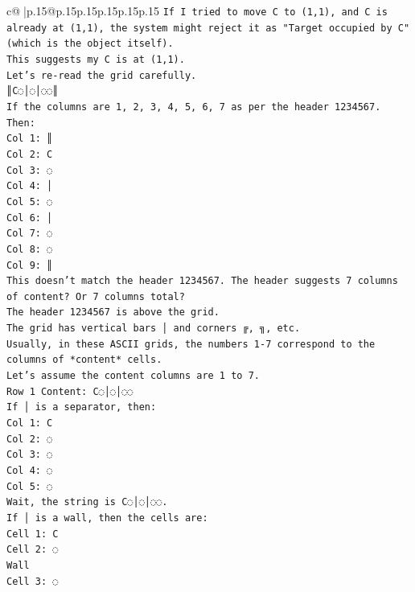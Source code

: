 \documentclass{article}
\begin{document}
{\begin{supertabular}{c@{$\;$}|p{.15\linewidth}@{}p{.15\linewidth}p{.15\linewidth}p{.15\linewidth}p{.15\linewidth}p{.15\linewidth}}
{{{\texttt{If I tried to move C to (1,1), and C is already at (1,1), the system might reject it as "Target occupied by C" (which is the object itself).} \\
\texttt{This suggests my C is at (1,1).} \\
\texttt{Let's re{-}read the grid carefully.} \\
\texttt{║C◌│◌│◌◌║} \\
\texttt{If the columns are 1, 2, 3, 4, 5, 6, 7 as per the header 1234567.} \\
\texttt{Then:} \\
\texttt{Col 1: ║} \\
\texttt{Col 2: C} \\
\texttt{Col 3: ◌} \\
\texttt{Col 4: │} \\
\texttt{Col 5: ◌} \\
\texttt{Col 6: │} \\
\texttt{Col 7: ◌} \\
\texttt{Col 8: ◌} \\
\texttt{Col 9: ║} \\
\texttt{This doesn't match the header 1234567. The header suggests 7 columns of content? Or 7 columns total?} \\
\texttt{The header 1234567 is above the grid.} \\
\texttt{The grid has vertical bars │ and corners ╔, ╗, etc.} \\
\texttt{Usually, in these ASCII grids, the numbers 1{-}7 correspond to the columns of *content* cells.} \\
\texttt{Let's assume the content columns are 1 to 7.} \\
\texttt{Row 1 Content: C◌│◌│◌◌} \\
\texttt{If │ is a separator, then:} \\
\texttt{Col 1: C} \\
\texttt{Col 2: ◌} \\
\texttt{Col 3: ◌} \\
\texttt{Col 4: ◌} \\
\texttt{Col 5: ◌} \\
\texttt{Wait, the string is C◌│◌│◌◌.} \\
\texttt{If │ is a wall, then the cells are:} \\
\texttt{Cell 1: C} \\
\texttt{Cell 2: ◌} \\
\texttt{Wall} \\
\texttt{Cell 3: ◌} \\
}}}
\end{supertabular}}
\end{document}
